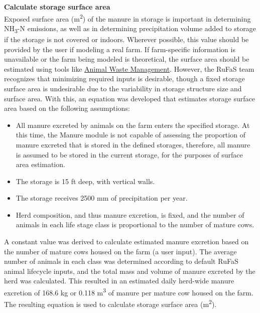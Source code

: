 \begin{refsection}
\vspace{0.25cm}

\textbf{Calculate storage surface area}\\
Exposed surface area (m\textsuperscript{2}) of the manure in storage is important in determining NH\textsubscript{3}-N emissions, as well as in determining precipitation volume added to storage if the storage is not covered or indoors. Wherever possible, this value should be provided by the user if modeling a real farm. If farm-specific information is unavailable or the farm being modeled is theoretical, the surface area should be estimated using tools like \hyperlink{https://www.nrcs.usda.gov/resources/tech-tools/usda-animal-waste-management-version-241}{Animal Waste Management}. However, the RuFaS team recognizes that minimizing required inputs is desirable, though a fixed storage surface area is undesirable due to the variability in storage structure size and surface area. With this, an equation was developed that estimates storage surface area based on the following assumptions:
    \begin{itemize}
        \item All manure excreted by animals on the farm enters the specified storage. At this time, the Manure module is not capable of assessing the proportion of manure excreted that is stored in the defined storages, therefore, all manure is assumed to be stored in the current storage, for the purposes of surface area estimation.
        \item The storage is 15 ft deep, with vertical walls.
        \item The storage receives 2500 mm of precipitation per year. 
        \item Herd composition, and thus manure excretion, is fixed, and the number of animals in each life stage class is proportional to the number of mature cows. 
    \end{itemize}
A constant value was derived to calculate estimated manure excretion based on the number of mature cows housed on the farm (a user input). The average number of animals in each class was determined according to default RuFaS animal lifecycle inputs, and the total mass and volume of manure excreted by the herd was calculated. This resulted in an estimated daily herd-wide manure excretion of 168.6 kg or 0.118  m\textsuperscript{3} of manure per mature cow housed on the farm. The resulting equation is used to calculate storage surface area (m\textsuperscript{2}).
        \vspace{0.5cm}


\end{refsection}
